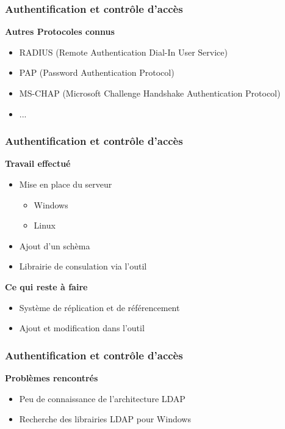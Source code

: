 \begin{frame}
  \frametitle{Authentification et contrôle d'accès}
  \begin{block}{\textbf{Autres Protocoles connus}}
  \begin{itemize}
  \item RADIUS (Remote Authentication Dial-In User Service)
  \item PAP (Password Authentication Protocol)
  \item MS-CHAP (Microsoft Challenge Handshake Authentication Protocol)
  \item ... 
  \end{itemize}
  \end{block}
\end{frame}

\begin{frame}
  \frametitle{Authentification et contrôle d'accès}
  \begin{block}{\textbf{Travail effectué}}
  \begin{itemize}
  \item Mise en place du serveur 
    \begin{itemize}
    \item Windows
    \item Linux
    \end{itemize}
  \item Ajout d'un schèma 
  \item Librairie de consulation via l'outil %
  \end{itemize}
  \end{block}

\pause  \begin{block}{\textbf{Ce qui reste à faire}}
  \begin{itemize}
  \item Système de réplication et de référencement 
  \item Ajout et modification dans l'outil
  \end{itemize}
  \end{block}
\end{frame}

\begin{frame}
  \frametitle{Authentification et contrôle d'accès}
  \begin{block}{\textbf{Problèmes rencontrés }}
  \begin{itemize}
  \item Peu de connaissance de l'architecture LDAP
  \item Recherche des librairies LDAP pour Windows 
  
  \end{itemize}
  \end{block}
\end{frame}